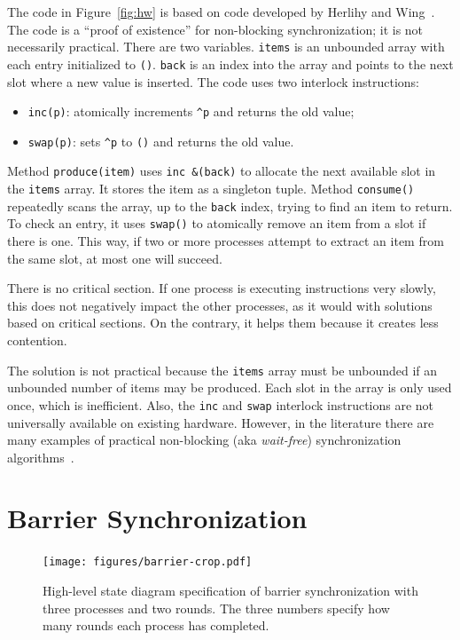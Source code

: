 \documentclass{report}
\begin{document}
The code in Figure~\ref{fig:hw} is based on code developed by Herlihy and
Wing~\cite{HW87}.
The code is a ``proof of existence'' for non-blocking synchronization; it
is not necessarily practical.
There are two variables.  \texttt{items} is an unbounded array with each
entry initialized to \texttt{()}.  \texttt{back} is an index into the
array and points to the next slot where a new value is inserted.
The code uses two interlock instructions:
\begin{itemize}
\item \texttt{inc(p)}: atomically increments \texttt{\^{}p} and returns
the old value;
\item \texttt{swap(p)}: sets \texttt{\^{}p} to \texttt{()} and returns
the old value.
\end{itemize}

Method \texttt{produce(item)} uses \texttt{inc \&(back)} to allocate
the next available slot in the \texttt{items} array.
It stores the item as a singleton tuple.
Method \texttt{consume()} repeatedly scans the array, up to the
\texttt{back} index, trying to find an item to return.
To check an entry, it uses \texttt{swap()}
to atomically remove an item from a slot if there is one.
This way, if two or more processes attempt to extract an item from
the same slot, at most one will succeed.

There is no critical section.  If one process is executing instructions
very slowly, this does not negatively impact the other processes, as it
would with solutions based on critical sections.
On the contrary, it helps them because it creates less contention.

The solution is not practical because the \texttt{items} array must be
unbounded if an unbounded number of items may be produced.  Each slot
in the array is only used once, which is inefficient.  Also, the \texttt{inc}
and \texttt{swap} interlock instructions are not universally available
on existing hardware.
However, in the literature there are many examples of practical
non-blocking (aka \emph{wait-free})
synchronization algorithms~\cite{}.

\chapter{Barrier Synchronization}
\label{ch:barrier}

\begin{figure}
\begin{center}
\texttt{[image: figures/barrier-crop.pdf]}
\end{center}
\caption{High-level state diagram specification of barrier synchronization
with three processes and two rounds.  The three numbers specify how many
rounds each process has completed.}
\label{fig:barrierdiagram}
\end{figure}
\end{document}
